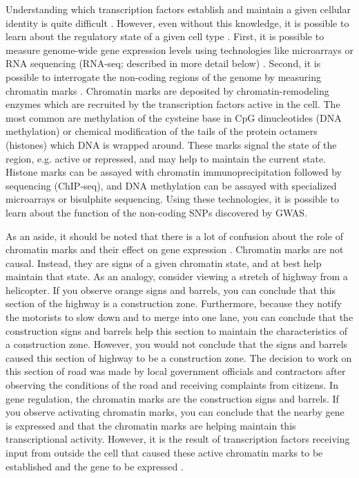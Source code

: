 Understanding which transcription factors establish and maintain a
given cellular identity is quite difficult \citep{Vaquerizas2009,
  Biggin2011, Zaret2016}. However, even without this knowledge, it is
possible to learn about the regulatory state of a given cell type
\citep{Ho2014}. First, it is possible to measure genome-wide gene
expression levels using technologies like microarrays or RNA
sequencing (RNA-seq; described in more detail below) \citep{Wang2009,
  Oshlack2010, Waern2011}. Second, it is possible to interrogate the
non-coding regions of the genome by measuring chromatin marks
\citep{Park2009, Landt2012}. Chromatin marks are deposited by
chromatin-remodeling enzymes which are recruited by the transcription
factors active in the cell. The most common are methylation of the
cysteine base in CpG dinucleotides (DNA methylation) or chemical
modification of the tails of the protein octamers (histones) which DNA
is wrapped around. These marks signal the state of the region,
e.g. active or repressed, and may help to maintain the current
state. Histone marks can be assayed with chromatin immunoprecipitation
followed by sequencing (ChIP-seq), and DNA methylation can be assayed
with specialized microarrays or bisulphite sequencing. Using these
technologies, it is possible to learn about the function of the
non-coding SNPs discovered by GWAS.

As an aside, it should be noted that there is a lot of confusion about
the role of chromatin marks and their effect on gene expression
\citep{Henikoff2011}. Chromatin marks are not causal. Instead, they
are signs of a given chromatin state, and at best help maintain that
state. As an analogy, consider viewing a stretch of highway from a
helicopter. If you observe orange signs and barrels, you can conclude
that this section of the highway is a construction zone. Furthermore,
because they notify the motorists to slow down and to merge into one
lane, you can conclude that the construction signs and barrels help
this section to maintain the characteristics of a construction
zone. However, you would not conclude that the signs and barrels
caused this section of highway to be a construction zone. The decision
to work on this section of road was made by local government officials
and contractors after observing the conditions of the road and
receiving complaints from citizens. In gene regulation, the chromatin
marks are the construction signs and barrels. If you observe
activating chromatin marks, you can conclude that the nearby gene is
expressed and that the chromatin marks are helping maintain this
transcriptional activity. However, it is the result of transcription
factors receiving input from outside the cell that caused these active
chromatin marks to be established and the gene to be expressed
\citep{Natoli2010}.

